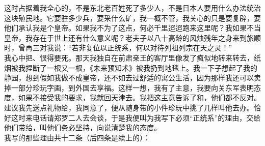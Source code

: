 这时占据着我全心的，不是东北老百姓死了多少人，不是日本人要用什么办法统治这块殖民地。它要驻多少兵，要采什么矿，我一概不管，我关心的只是要复辟，要他们承认我是个皇帝。如果我不为了这点，何必千里迢迢跑来这里呢？我如果不当皇帝，我存在于世上还有什么意义呢？老夫子以八十高龄的风烛残年之身来到旅顺时，曾再三对我说：“若非复位以正统系，何以对待列祖列宗在天之灵！”\\

我心中把、恨得要死。那天我独自在前肃亲王的客厅里像发了疯似地转来转去，纸烟被我捏断了一根又一根，《未来预知术》被我扔到地毯上。我一下子想起了我的静园，想到假如我做不成皇帝，还不如去过舒适的寓公生活，因为那样我还可以卖掉一部分珍玩字画，到外国去享福。这样一想，我有了主意，我要向关东军表明态度，如果不接受我的要求，我就回天津去。我把这主意告诉了和，他们都不反对。建议我先送点礼物给，我同意了，便从随身带的小件珍玩中挑了几样叫他去办。恰好这时来电话请郑罗二人去会谈，于是我便叫为我写下必须“正统系”的理由，交给他们带给，叫他们务必坚持，向说清楚我的态度。\\

我写的那些理由共十二条（后四条是续上的）：\\


